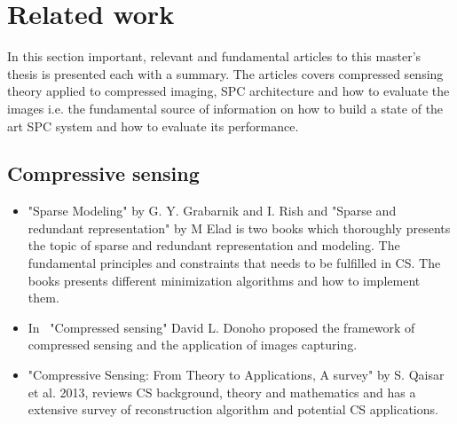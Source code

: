 \section{Related work}
\label{sec:related_work}
In this section important, relevant and fundamental articles to this master's thesis is presented each with a summary. The articles covers compressed sensing theory applied to compressed imaging, SPC architecture and how to evaluate the images i.e. the fundamental source of information on how to build a state of the art SPC system and how to evaluate its performance. 

\subsection{Compressive sensing}
\begin{itemize}


\item \cite{book:sm, book:srr} "Sparse Modeling" by G. Y. Grabarnik and  I. Rish and "Sparse and redundant representation" by M Elad is two books which thoroughly presents the topic of sparse and redundant representation and modeling. The fundamental principles and constraints that needs to be fulfilled in CS. The books presents different minimization algorithms and how to implement them.   

\item In~\cite{article:CS_donoho1} "Compressed sensing" David L. Donoho proposed the framework of compressed sensing and the application of images capturing.

\item \cite{article:CS_from_theory_a_sur} "Compressive Sensing: From Theory to Applications, A survey" by S. Qaisar et al. 2013, reviews CS background, theory and mathematics and has a extensive survey of reconstruction algorithm and potential CS applications.

\end{itemize}
